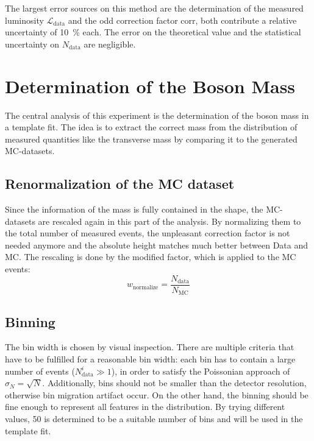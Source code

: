 \documentclass[
	paper=A4,
	parskip=full,
	chapterprefix=true,
	11pt,
	headings=normal,
	bibliography=totoc,
	listof=totoc,
	titlepage=on,
]{scrreprt}
\begin{document}
The largest error sources on this method are the determination of the measured luminosity $\mathcal{L}_\mathrm{data}$ and the odd correction factor $\mathrm{corr}$, both contribute a relative uncertainty of \SI{10}{\percent} each. The error on the theoretical value and the statistical uncertainty on $N_\mathrm{data}$ are negligible.

\chapter{Determination of the \PW Boson Mass}
The central analysis of this experiment is the determination of the \PW boson mass in a template fit. The idea is to extract the correct \PW mass from the distribution of measured quantities like the transverse mass by comparing it to the generated MC-datasets. 


\section{Renormalization of the MC dataset}
Since the information of the \PW mass is fully contained in the shape, the MC-datasets are rescaled again in this part of the analysis. By normalizing them to the total number of measured events, the unpleasant correction factor is not needed anymore and the absolute height matches much better between Data and MC. The rescaling is done by the modified factor, which is applied to the MC events:
\begin{equation}
w_{\mathrm{normalize}}=\frac{N_{\mathrm{data}}}{N_{\mathrm{MC}}}
\end{equation}

\section{Binning}
The bin width is chosen by visual inspection. There are multiple criteria that have to be fulfilled for a reasonable bin width: each bin has to contain a large number of events ($N^i_\mathrm{data} \gg 1$), in order to satisfy the Poissonian approach of $\sigma_N = \sqrt{N}$. Additionally, bins should not be smaller than the detector resolution, otherwise bin migration artifact occur. On the other hand, the binning should be fine enough to represent all features in the distribution. By trying different values, \num{50} is determined to be a suitable number of bins and will be used in the template fit.
\end{document}
